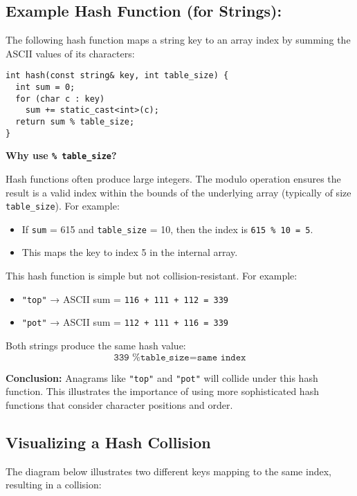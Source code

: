 \documentclass{article}
\begin{document}
\subsection*{Example Hash Function (for Strings):}

The following hash function maps a string key to an array index by summing the ASCII values of its characters:

\begin{lstlisting}[style=cppstyle]
int hash(const string& key, int table_size) {
  int sum = 0;
  for (char c : key)
    sum += static_cast<int>(c);
  return sum % table_size;
}
\end{lstlisting}

\textbf{Why use \texttt{\% table\_size}?}

Hash functions often produce large integers. The modulo operation ensures the result is a valid index within the bounds of the underlying array (typically of size \texttt{table\_size}). For example:

\begin{itemize}
  \item If \texttt{sum} = 615 and \texttt{table\_size} = 10, then the index is \texttt{615 \% 10 = 5}.
  \item This maps the key to index 5 in the internal array.
\end{itemize}

This hash function is simple but not collision-resistant. For example:

\begin{itemize}
  \item \texttt{"top"} → ASCII sum = \texttt{116 + 111 + 112 = 339}
  \item \texttt{"pot"} → ASCII sum = \texttt{112 + 111 + 116 = 339}
\end{itemize}

Both strings produce the same hash value:
\[
\texttt{339 \% table\_size} = \texttt{same index}
\]

\textbf{Conclusion:} Anagrams like \texttt{"top"} and \texttt{"pot"} will collide under this hash function. This illustrates the importance of using more sophisticated hash functions that consider character positions and order.

\subsection{Visualizing a Hash Collision}

The diagram below illustrates two different keys mapping to the same index, resulting in a collision:
\end{document}
